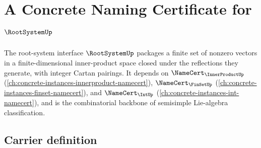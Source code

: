\chapter{A Concrete Naming Certificate for $\RootSystemUp$}
\label{ch:concrete-instances-rootsystem-namecert}

The root-system interface $\RootSystemUp$ packages a finite set of nonzero vectors in a finite-dimensional inner-product space closed under the reflections they generate, with integer Cartan pairings. It depends on $\NameCert_{\InnerProductUp}$ (\autoref{ch:concrete-instances-innerproduct-namecert}), $\NameCert_{\FinSetUp}$ (\autoref{ch:concrete-instances-finset-namecert}), and $\NameCert_{\IntUp}$ (\autoref{ch:concrete-instances-int-namecert}), and is the combinatorial backbone of semisimple Lie-algebra classification.

\section{Carrier definition}
\label{sec:rootsystem-carrier}

